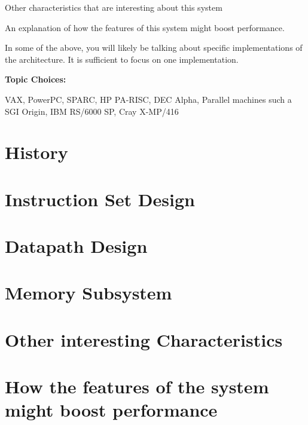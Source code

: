 \documentclass[letterpaper,12pt,titlepage]{article}
\begin{document}
Other characteristics that are interesting about this system

An explanation of how the features of this system might boost performance.

In some of the above, you will likely be talking about specific implementations of the architecture. It is sufficient to focus on one implementation.

\textbf{Topic Choices:}

VAX,
PowerPC,
SPARC,
HP PA-RISC,
DEC Alpha,
Parallel machines such a SGI Origin, IBM RS/6000 SP, Cray X-MP/416

\begin{multicols}{2}
\section*{History }
\section*{Instruction Set Design}
\section*{Datapath Design}
\section*{Memory Subsystem}
\section*{Other interesting Characteristics}
\section*{How the features of the system might boost performance}
\end{multicols}


\end{document}
